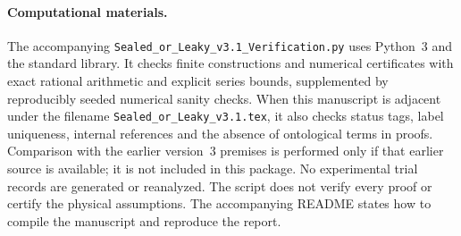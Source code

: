 \documentclass[11pt,a4paper]{article}
\theoremstyle{definition}
\theoremstyle{remark}\newtheorem{remark}[theorem]{Remark}
\begin{document}
\paragraph{Computational materials.}
The accompanying \texttt{Sealed\_or\_Leaky\_v3.1\_Verification.py} uses Python~3 and the standard library. It checks finite constructions and numerical certificates with exact rational arithmetic and explicit series bounds, supplemented by reproducibly seeded numerical sanity checks. When this manuscript is adjacent under the filename \texttt{Sealed\_or\_Leaky\_v3.1.tex}, it also checks status tags, label uniqueness, internal references and the absence of ontological terms in proofs. Comparison with the earlier version~3 premises is performed only if that earlier source is available; it is not included in this package. No experimental trial records are generated or reanalyzed. The script does not verify every proof or certify the physical assumptions. The accompanying README states how to compile the manuscript and reproduce the report.
\clearpage
{}
{}
\end{document}
